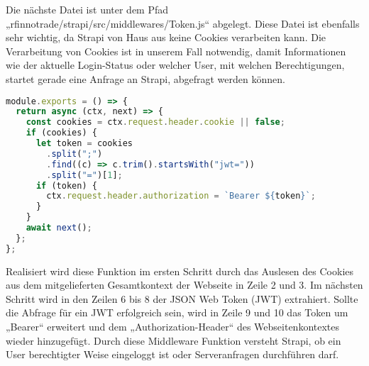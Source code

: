 Die nächste Datei ist unter dem Pfad „rfinnotrade/strapi/src/middlewares/Token.js“ abgelegt.
Diese Datei ist ebenfalls sehr wichtig, da Strapi von Haus aus keine Cookies verarbeiten kann. Die Verarbeitung von Cookies ist in unserem Fall notwendig, damit Informationen wie der aktuelle Login-Status oder welcher User, mit welchen Berechtigungen, startet gerade eine Anfrage an Strapi, abgefragt werden können.

\begin{lstlisting}[language=JavaScript, caption={Token.js}, label={lst:tokenjs}]
    module.exports = () => {
  return async (ctx, next) => {
    const cookies = ctx.request.header.cookie || false;
    if (cookies) {
      let token = cookies
        .split(";")
        .find((c) => c.trim().startsWith("jwt="))
        .split("=")[1];
      if (token) {
        ctx.request.header.authorization = `Bearer ${token}`;
      }
    }
    await next();
  };
};
\end{lstlisting}

Realisiert wird diese Funktion im ersten Schritt durch das Auslesen des Cookies aus dem mitgelieferten Gesamtkontext der Webseite in Zeile 2 und 3. Im nächsten Schritt wird in den Zeilen 6 bis 8 der JSON Web Token (JWT) extrahiert. Sollte die Abfrage für ein JWT erfolgreich sein, wird in Zeile 9 und 10 das Token um „Bearer“ erweitert und dem „Authorization-Header“ des Webseitenkontextes wieder hinzugefügt.
Durch diese Middleware Funktion versteht Strapi, ob ein User berechtigter Weise eingeloggt ist oder Serveranfragen durchführen darf.
